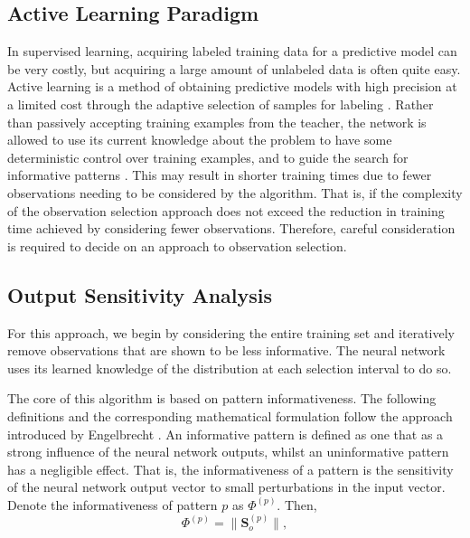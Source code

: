 \documentclass[10pt, conference]{IEEEtran}
\begin{document}
\subsection{Active Learning Paradigm}
In supervised learning, acquiring labeled training data for a predictive model can be very costly, but acquiring a large amount of unlabeled data is often quite easy. Active learning is a method of obtaining predictive models with high precision at a limited cost through the adaptive selection of samples for labeling \cite{Hino2020ActiveLP}. Rather than passively accepting training examples from the teacher, the network is allowed to use its current knowledge about the problem to have some deterministic control over training examples, and to guide the search for informative patterns \cite{sasla}. This may result in shorter training times due to fewer observations needing to be considered by the algorithm. That is, if the complexity of the observation selection approach does not exceed the reduction in training time achieved by considering fewer observations. Therefore, careful consideration is required to decide on an approach to observation selection.



\subsection{Output Sensitivity Analysis}
For this approach, we begin by considering the entire training set and iteratively remove observations that are shown to be less informative. The neural network uses its learned knowledge of the distribution at each selection interval to do so.


The core of this algorithm is based on pattern informativeness. The following definitions and the corresponding mathematical formulation follow the approach introduced by Engelbrecht \cite{sasla}. An informative pattern is defined as one that as a strong influence of the neural network outputs, whilst an uninformative pattern has a negligible effect. That is, the informativeness of a pattern is the sensitivity of the neural network output vector to small perturbations in the input vector. Denote the informativeness of pattern $p$ as $\Phi^{(p)}$. Then,
\begin{equation}
	\Phi^{(p)} = \lVert \mathbf{S}_o^{(p)}	 \rVert,
	\label{eq:inform}
\end{equation}
\end{document}
